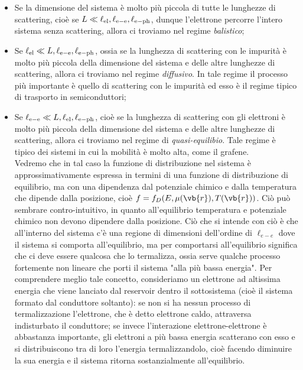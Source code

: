\begin{itemize}[leftmargin=0.5cm]
    \item Se la dimensione del sistema è molto più piccola di tutte le lunghezze di scattering, cioè se $L \ll \ell_{\rm el}, \ell_{\rm e-e}, \ell_{\rm e-ph}$, dunque l'elettrone percorre l'intero sistema senza scattering, allora ci troviamo nel regime \textit{balistico};
    \item Se $\ell_{\rm el} \ll L, \ell_{\rm e-e}, \ell_{\rm e-ph}$, ossia se la lunghezza di scattering con le impurità è molto più piccola della dimensione del sistema e delle altre lunghezze di scattering, allora ci troviamo nel regime \textit{diffusivo}. In tale regime il processo più importante è quello di scattering con le impurità ed esso è il regime tipico di trasporto in semiconduttori;
    \item Se $\ell_{\rm e-e} \ll L, \ell_{\rm el}, \ell_{\rm e-ph}$, cioè se la lunghezza di scattering con gli elettroni è molto più piccola della dimensione del sistema e delle altre lunghezze di scattering, allora ci troviamo nel regime di \textit{quasi-equilibio}. Tale regime è tipico dei sistemi in cui la mobilità è molto alta, come il grafene.\\
    Vedremo che in tal caso la funzione di distribuzione nel sistema è approssimativamente espressa in termini di una funzione di distribuzione di equilibrio, ma con una dipendenza dal potenziale chimico e dalla temperatura che dipende dalla posizione, cioè $f=f_D(E,\mu(\vb{r}),T(\vb{r}))$. Ciò può sembrare contro-intuitivo, in quanto all'equilibrio temperatura e potenziale chimico non devono dipendere dalla posizione. Ciò che si intende con ciò è che all'interno del sistema c'è una regione di dimensioni dell'ordine di $\ell_{e-e}$ dove il sistema si comporta all'equilibrio, ma per comportarsi all'equilibrio significa che ci deve essere qualcosa che lo termalizza, ossia serve qualche processo fortemente non lineare che porti il sistema "alla più bassa energia". Per comprendere meglio tale concetto, consideriamo un elettrone ad altissima energia che viene lanciato dal reservoir dentro il sottosistema (cioè il sistema formato dal conduttore soltanto): se non si ha nessun processo di termalizzazione l'elettrone, che è detto elettrone caldo, attraversa indisturbato il conduttore; se invece l'interazione elettrone-elettrone è abbastanza importante, gli elettroni a più bassa energia scatterano con esso e si distribuiscono tra di loro l'energia termalizzandolo, cioè facendo diminuire la sua energia e il sistema ritorna sostanzialmente all'equilibrio.\\

\end{itemize}
